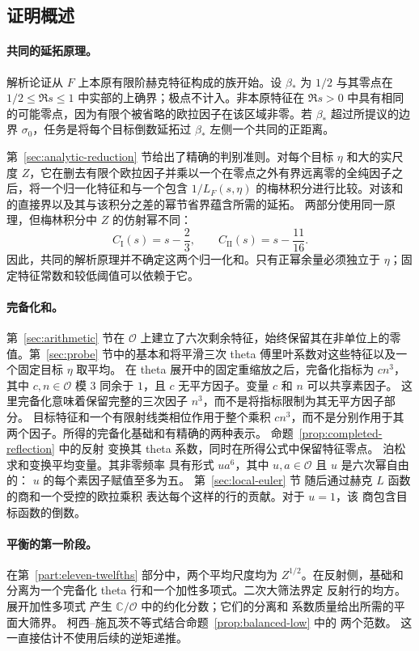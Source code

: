 \documentclass[11pt,a4paper]{article}
\numberwithin{equation}{section}
\numberwithin{figure}{section}
\theoremstyle{definition}
\theoremstyle{remark}
\begin{document}
\subsection*{证明概述}

\paragraph{共同的延拓原理。}
解析论证从 $F$ 上本原有限阶赫克特征构成的族开始。设 $\beta_*$ 为 $1/2$ 与其零点在 $1/2\le\Re s\le1$ 中实部的上确界；极点不计入。非本原特征在 $\Re s>0$ 中具有相同的可能零点，因为有限个被省略的欧拉因子在该区域非零。若 $\beta_*$ 超过所提议的边界 $\sigma_0$，任务是将每个目标倒数延拓过 $\beta_*$ 左侧一个共同的正距离。

第~\ref{sec:analytic-reduction} 节给出了精确的判别准则。对每个目标 $\eta$ 和大的实尺度 $Z$，它在删去有限个欧拉因子并乘以一个在零点之外有界远离零的全纯因子之后，将一个归一化特征和与一个包含 $1/L_F(s,\eta)$ 的梅林积分进行比较。对该和的直接界以及其与该积分之差的幂节省界蕴含所需的延拓。
两部分使用同一原理，但梅林积分中 $Z$ 的仿射幂不同：
\[
 C_{\mathrm I}(s)=s-\frac23,\qquad
 C_{\mathrm{II}}(s)=s-\frac{11}{16}.
\]
因此，共同的解析原理并不确定这两个归一化和。只有正幂余量必须独立于 $\eta$；固定特征常数和较低阈值可以依赖于它。

\paragraph{完备化和。}
第~\ref{sec:arithmetic} 节在 $\mathcal O$ 上建立了六次剩余特征，始终保留其在非单位上的零值。第~\ref{sec:probe} 节中的基本和将平滑三次 theta 傅里叶系数对这些特征以及一个固定目标 $\eta$ 取平均。
在 theta 展开中的固定重缩放之后，完备化指标为 $cn^3$，其中 $c,n\in\mathcal O$ 模 $3$ 同余于 $1$，且 $c$ 无平方因子。变量 $c$ 和 $n$ 可以共享素因子。
这里完备化意味着保留完整的三次因子 $n^3$，而不是将指标限制为其无平方因子部分。
目标特征和一个有限射线类相位作用于整个乘积 $cn^3$，而不是分别作用于其两个因子。所得的完备化基础和有精确的两种表示。
命题~\ref{prop:completed-reflection} 中的反射
变换其 theta 系数，同时在所得公式中保留特征零点。
泊松求和变换平均变量。其非零频率
具有形式 $ua^6$，其中 $u,a\in\mathcal O$ 且 $u$ 是六次幂自由的：
$u$ 的每个素因子赋值至多为五。
第~\ref{sec:local-euler} 节
随后通过赫克 $L$ 函数的商和一个受控的欧拉乘积
表达每个这样的行的贡献。对于 $u=1$，该
商包含目标函数的倒数。

\paragraph{平衡的第一阶段。}
在第~\ref{part:eleven-twelfths} 部分中，两个平均尺度均为
$Z^{1/2}$。在反射侧，基础和分离为一个完备化
theta 行和一个加性多项式。二次大筛法界定
反射行的均方。展开加性多项式
产生 $\mathbb C/\mathcal O$ 中的约化分数；它们的分离和
系数质量给出所需的平面大筛界。
柯西--施瓦茨不等式结合命题~\ref{prop:balanced-low} 中的
两个范数。
这一直接估计不使用后续的逆矩递推。
\end{document}

